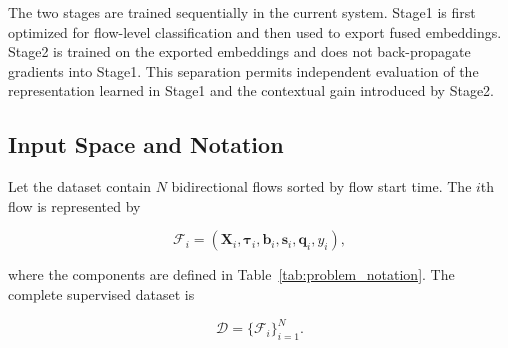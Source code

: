 The two stages are trained sequentially in the current system. Stage1 is first
optimized for flow-level classification and then used to export fused
embeddings. Stage2 is trained on the exported embeddings and does not
back-propagate gradients into Stage1. This separation permits independent
evaluation of the representation learned in Stage1 and the contextual gain
introduced by Stage2.

\subsection{Input Space and Notation}
\label{subsec:input_notation}

Let the dataset contain $N$ bidirectional flows sorted by flow start time. The
$i$th flow is represented by

\begin{equation}
\mathcal{F}_i =
\left(
    \mathbf{X}_i,
    \boldsymbol{\tau}_i,
    \mathbf{b}_i,
    \mathbf{s}_i,
    \mathbf{q}_i,
    y_i
\right),
\end{equation}

where the components are defined in
Table~\ref{tab:problem_notation}. The complete supervised dataset is

\begin{equation}
\mathcal{D}=\{\mathcal{F}_i\}_{i=1}^{N}.
\end{equation}

